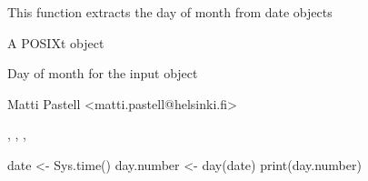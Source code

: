 \begin{Description}\relax
This function extracts the day of month from date objects
\end{Description}
\begin{Arguments}
\begin{ldescription}
\item[\code{x}] A POSIXt object
\end{ldescription}
\end{Arguments}
\begin{Value}
\begin{ldescription}
\item[\code{day}] Day of month for the input object
\end{ldescription}
\end{Value}
\begin{Author}\relax
Matti Pastell <matti.pastell@helsinki.fi>
\end{Author}
\begin{SeeAlso}\relax
{}, ,
, 
\end{SeeAlso}
\begin{Examples}
\begin{ExampleCode}
date <- Sys.time()
day.number <- day(date)
print(day.number)
\end{ExampleCode}
\end{Examples}

